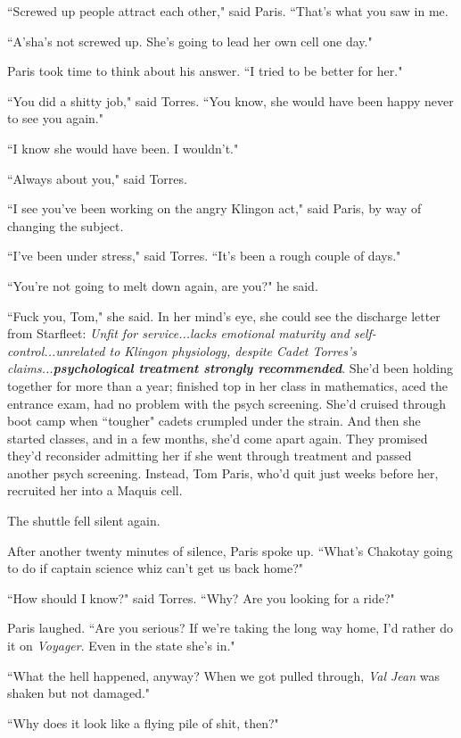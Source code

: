 \documentclass[twoside,letterpaper,12pt]{memoir}
\begin{document}
``Screwed up people attract each other," said Paris. ``That's what you saw in me.

``A'sha's not screwed up. She's going to lead her own cell one day."

Paris took time to think about his answer. ``I tried to be better for her."

``You did a shitty job," said Torres. ``You know, she would have been happy never to see you again."

``I know she would have been. I wouldn't."

``Always about you," said Torres.

``I see you've been working on the angry Klingon act," said Paris, by way of changing the subject.

``I've been under stress," said Torres. ``It's been a rough couple of days."

``You're not going to melt down again, are you?" he said.

``Fuck you, Tom," she said. In her mind's eye, she could see the discharge letter from Starfleet: \textit{Unfit for service...lacks emotional maturity and self-control...unrelated to Klingon physiology, despite Cadet Torres's claims...\textbf{psychological treatment strongly recommended}}. She'd been holding together for more than a year; finished top in her class in mathematics, aced the entrance exam, had no problem with the psych screening. She'd cruised through boot camp when ``tougher" cadets crumpled under the strain. And then she started classes, and in a few months, she'd come apart again. They promised they'd reconsider admitting her if she went through treatment and passed another psych screening. Instead, Tom Paris, who'd quit just weeks before her, recruited her into a Maquis cell.

The shuttle fell silent again.

After another twenty minutes of silence, Paris spoke up. ``What's Chakotay going to do if captain science whiz can't get us back home?"

``How should I know?" said Torres. ``Why? Are you looking for a ride?"

Paris laughed. ``Are you serious? If we're taking the long way home, I'd rather do it on \textit{Voyager}. Even in the state she's in."

``What the hell happened, anyway? When we got pulled through, \textit{Val Jean} was shaken but not damaged."

``Why does it look like a flying pile of shit, then?"
\end{document}
